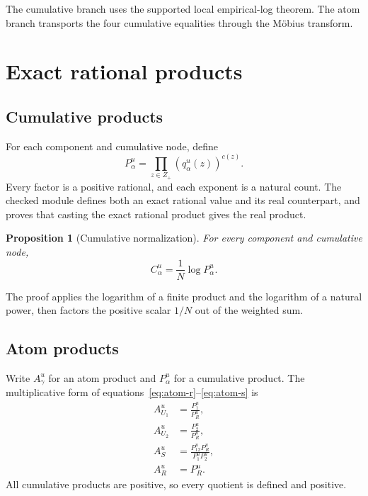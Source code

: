 \documentclass[11pt]{article}
\newtheorem{proposition}[theorem]{Proposition}
\theoremstyle{definition}
\begin{document}
The cumulative branch uses the supported local empirical-log theorem.  The atom branch transports
the four cumulative equalities through the M\"obius transform.

\section{Exact rational products}

\subsection{Cumulative products}

For each component and cumulative node, define
\begin{equation}\label{eq:cumulative-product}
P^u_\alpha
=\prod_{z\in Z_+}\left(q^u_\alpha(z)\right)^{c(z)}.
\end{equation}
Every factor is a positive rational, and each exponent is a natural count.  The checked module defines
both an exact rational value and its real counterpart, and proves that casting the exact rational
product gives the real product.

\begin{proposition}[Cumulative normalization]\label{prop:cumulative-product}
For every component and cumulative node,
\begin{equation}\label{eq:cumulative-scaled-log}
C^u_\alpha=\frac1N\log P^u_\alpha.
\end{equation}
\end{proposition}

The proof applies the logarithm of a finite product and the logarithm of a natural power, then
factors the positive scalar \(1/N\) out of the weighted sum.

\subsection{Atom products}

Write \(A^u_\gamma\) for an atom product and \(P^u_\alpha\) for a cumulative product.  The
multiplicative form of equations~\eqref{eq:atom-r}--\eqref{eq:atom-s} is
\begin{align}
A^u_{U_1}&=\frac{P^u_1}{P^u_R},\label{eq:product-u1}\\
A^u_{U_2}&=\frac{P^u_2}{P^u_R},\label{eq:product-u2}\\
A^u_S&=\frac{P^u_{12}P^u_R}{P^u_1P^u_2},\label{eq:product-s}\\
A^u_R&=P^u_R.\label{eq:product-r}
\end{align}
All cumulative products are positive, so every quotient is defined and positive.
\end{document}

